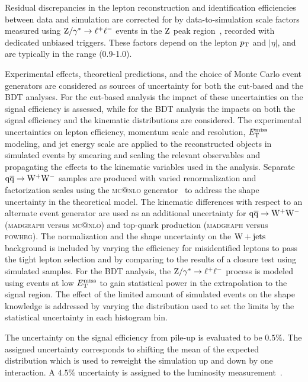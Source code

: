 \documentclass[11pt,twoside,a4paper,cmspaper,final,collab]{cms-tdr}
\begin{document}
Residual discrepancies in the lepton reconstruction and identification
efficiencies between data and simulation are corrected for by
data-to-simulation scale factors measured using $\mathrm{Z}/\gamma^*\to \ell^+\ell^-$ events in the
$\mathrm{Z}$ peak region~\cite{wzxs}, recorded with dedicated unbiased triggers.
These factors depend on the lepton $p_{\mathrm{T}}$ and $|\eta|$, and
are typically in the range (0.9-1.0).

Experimental effects, theoretical predictions, and the choice of Monte Carlo event
generators are considered as sources of uncertainty for both the cut-based and the BDT analyses.
For the cut-based analysis the impact of these uncertainties on the signal efficiency is assessed, while
for the BDT analysis the impacts on both the signal efficiency and the
kinematic distributions are considered.
The experimental uncertainties on lepton efficiency, momentum scale and resolution, $E_{\mathrm{T}}^{\text{miss}}$
modeling, and jet energy scale are applied to the reconstructed objects in simulated events by smearing
and scaling the relevant observables and propagating the effects to the kinematic variables used
in the analysis. Separate $\mathrm{q}\mathrm{\overline{q}}\to \mathrm{W^+}{}\mathrm{W^-}$ samples are produced with varied
renormalization and factorization scales using the \textsc{mc@nlo} generator~\cite{MCatNLO} to address the
shape uncertainty in the theoretical model. The kinematic differences with respect to an
alternate event generator are used as an additional uncertainty for
$\mathrm{q}\mathrm{\overline{q}}\to \mathrm{W^+}{}\mathrm{W^-}$ (\textsc{madgraph} versus \textsc{mc@nlo}) and
top-quark production (\textsc{madgraph} versus \textsc{powheg}).
The normalization and the shape uncertainty on the $\mathrm{W}+\mathrm{jets}$ background is included by varying
the efficiency for misidentified leptons to pass the tight lepton
selection and by comparing to the results of a closure test using simulated samples.
For the BDT analysis, the $\mathrm{Z}/\gamma^*\to \ell^+\ell^-$ process is modeled using events at low
$E_{\mathrm{T}}^{\text{miss}}$ to gain statistical power in the extrapolation to the signal region. The effect of the
limited amount of simulated events on the shape knowledge is addressed by varying the
distribution used to set the limits by the statistical uncertainty in each histogram bin.

The uncertainty on the signal efficiency from pile-up is evaluated to be $0.5\%$.
The assigned uncertainty corresponds to shifting the mean of the
expected distribution which is used to reweight the simulation
up and down by one interaction.
A $4.5\%$ uncertainty is assigned to the luminosity
measurement~\cite{lumiPAS}.
\end{document}
